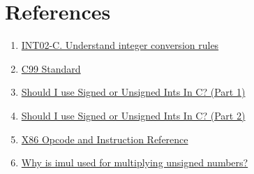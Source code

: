 \documentclass{article}
\begin{document}
\section{References}
\begin{enumerate}[noitemsep]
\item \href{https://wiki.sei.cmu.edu/confluence/display/c/INT02-C.+Understand+integer+conversion+rules}{INT02-C. Understand integer conversion rules}
\item \href{http://www.open-std.org/jtc1/sc22/wg14/www/docs/n1256.pdf}{C99 Standard}
\item \href{http://blog.robertelder.org/signed-or-unsigned/}{Should I use Signed or Unsigned Ints In C? (Part 1)}
\item \href{http://blog.robertelder.org/signed-or-unsigned-part-2/}{Should I use Signed or Unsigned Ints In C? (Part 2)}
\item \href{http://ref.x86asm.net/coder-abc.html}{X86 Opcode and Instruction Reference}
\item \href{https://stackoverflow.com/a/42589535/2407966}{Why is imul used for multiplying unsigned numbers?}

\end{enumerate}
\end{document}
